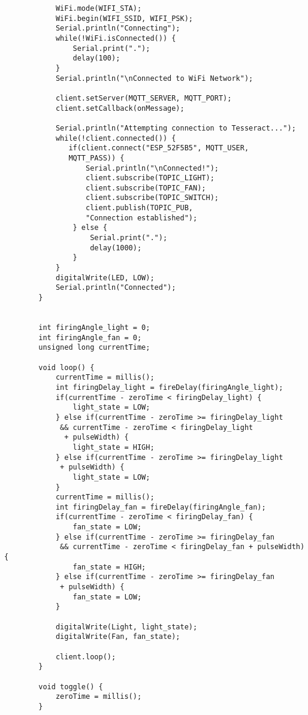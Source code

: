 \begin{lstlisting}
	        WiFi.mode(WIFI_STA);
	        WiFi.begin(WIFI_SSID, WIFI_PSK);
	        Serial.println("Connecting");
	        while(!WiFi.isConnected()) {
		        Serial.print(".");
		        delay(100);
	        }
	        Serial.println("\nConnected to WiFi Network");
	        
	        client.setServer(MQTT_SERVER, MQTT_PORT);
	        client.setCallback(onMessage);
	        
	        Serial.println("Attempting connection to Tesseract...");
	        while(!client.connected()) {
		       if(client.connect("ESP_52F5B5", MQTT_USER, 
		       MQTT_PASS)) {
			       Serial.println("\nConnected!");
			       client.subscribe(TOPIC_LIGHT);
			       client.subscribe(TOPIC_FAN);
			       client.subscribe(TOPIC_SWITCH);
			       client.publish(TOPIC_PUB, 
			       "Connection established");
		        } else {
			        Serial.print(".");
			        delay(1000);
		        }
	        }
	        digitalWrite(LED, LOW);
	        Serial.println("Connected");
        }
        
        
        int firingAngle_light = 0;
        int firingAngle_fan = 0;
        unsigned long currentTime;
        
        void loop() {
	        currentTime = millis();
	        int firingDelay_light = fireDelay(firingAngle_light);
	        if(currentTime - zeroTime < firingDelay_light) {
	        	light_state = LOW;
	        } else if(currentTime - zeroTime >= firingDelay_light
	         && currentTime - zeroTime < firingDelay_light
	          + pulseWidth) {
	        	light_state = HIGH;
	        } else if(currentTime - zeroTime >= firingDelay_light
	         + pulseWidth) {
	        	light_state = LOW;
	        }
	        currentTime = millis();
	        int firingDelay_fan = fireDelay(firingAngle_fan);
	        if(currentTime - zeroTime < firingDelay_fan) {
	        	fan_state = LOW;
	        } else if(currentTime - zeroTime >= firingDelay_fan
	         && currentTime - zeroTime < firingDelay_fan + pulseWidth) {
	        	fan_state = HIGH;
	        } else if(currentTime - zeroTime >= firingDelay_fan
	         + pulseWidth) {
	        	fan_state = LOW;
	        }
	        
	        digitalWrite(Light, light_state);
	        digitalWrite(Fan, fan_state);
	        
	        client.loop();
        }
        
        void toggle() {
       		zeroTime = millis();
        }
        

\end{lstlisting}
